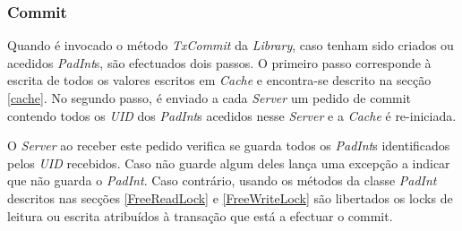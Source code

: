 \subsubsection{Commit}
\label{commit}

Quando é invocado o método \textit{TxCommit} da \textit{Library}, caso tenham sido criados ou acedidos \textit{PadInt}s, são efectuados dois passos. O primeiro passo corresponde à escrita de todos os valores escritos em \textit{Cache} e encontra-se descrito na secção \ref{cache}. No segundo passo, é enviado a cada \textit{Server} um pedido de commit contendo todos os \textit{UID} dos \textit{PadInt}s acedidos nesse \textit{Server} e a \textit{Cache} é re-iniciada.

O \textit{Server} ao receber este pedido verifica se guarda todos os \textit{PadInt}s identificados pelos \textit{UID} recebidos. Caso não guarde algum deles lança uma excepção a indicar que não guarda o \textit{PadInt}. Caso contrário, usando os métodos da classe \textit{PadInt} descritos nas secções \ref{FreeReadLock} e \ref{FreeWriteLock} são libertados os locks de leitura ou escrita atribuídos à transação que está a efectuar o commit.